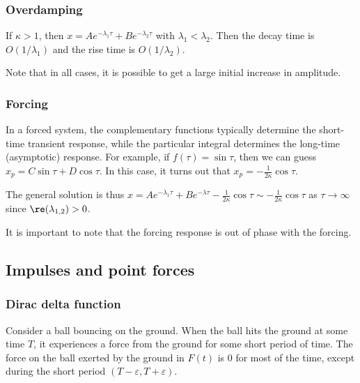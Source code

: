 \documentclass[a4paper]{article}
\begin{document}
\subsubsection*{Overdamping}
If $\kappa > 1$, then $x = Ae^{-\lambda_1\tau} + Be^{-\lambda_2\tau}$ with $\lambda_1 < \lambda_2$. Then the decay time is $O(1/\lambda_1)$ and the rise time is $O(1/\lambda_2)$.
\begin{center}
\end{center}
Note that in all cases, it is possible to get a large initial increase in amplitude.

\subsubsection*{Forcing}
In a forced system, the complementary functions typically determine the short-time transient response, while the particular integral determines the long-time (asymptotic) response.
For example, if $f(\tau) = \sin\tau$, then we can guess $x_p = C\sin \tau + D\cos\tau$. In this case, it turns out that $x_p = -\frac{1}{2\kappa}\cos\tau$.

The general solution is thus $x = Ae^{-\lambda_1\tau} + Be^{-\lambda \tau} - \frac{1}{2\kappa}\cos\tau \sim -\frac{1}{2\kappa}\cos\tau$ as $\tau\to \infty$ since $\re (\lambda_{1, 2}) > 0$.

It is important to note that the forcing response is out of phase with the forcing.
\subsection{Impulses and point forces}
\subsubsection{Dirac delta function}
Consider a ball bouncing on the ground. When the ball hits the ground at some time $T$, it experiences a force from the ground for some short period of time. The force on the ball exerted by the ground in $F(t)$ is $0$ for most of the time, except during the short period $(T - \varepsilon, T + \varepsilon)$.
\end{document}
